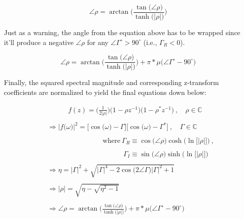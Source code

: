\documentclass{article}
\begin{document}
\begin{equation*}
    \angle{\rho} = \arctan\Bigg( \frac{\tan\big(\angle{\rho}\big)}{\tanh\big(\big|\rho\big|\big)} \Bigg)
  \end{equation*}\newline

Just as a warning, the angle from the equation above has to be wrapped since it'll produce a negative $\angle{\rho}$ for any $\angle{\Gamma}^{\circ} > 90^{\circ}$ (i.e., $\Gamma_{R} < 0$).

\begin{equation*}
    \angle{\rho} = \arctan\Bigg( \frac{\tan\big(\angle{\rho}\big)}{\tanh\big(\big|\rho\big|\big)} \Bigg) + \pi * \mu\Big(\angle{\Gamma}^{\circ} - 90^{\circ}\Big)
  \end{equation*}\newline

Finally, the squared spectral magnitude and corresponding z-transform coefficients are normalized to yield the final equations down below: 

\begin{align*}
    & \quad \quad \quad f(z) = \bigg(\frac{1}{2\big|\rho\big|}\bigg)\big(1 - \rho z^{-1}\big)\big(1 - \rho^{*}z^{-1}\big) \ , \quad \rho \in \mathbb{C} \\ \\
    & \Rightarrow \Big|f\big(\omega\big)\Big|^{2} = \Big[\cos\big(\omega\big) - \Gamma\Big]\Big[\cos\big(\omega\big) - \Gamma^{*}\Big] \ , \quad \Gamma \in \mathbb{C} \\ \\ 
    & \quad \quad \quad \quad \quad \quad \quad \quad \text{where} \ \Gamma_{R} \equiv \cos\big(\angle{\rho}\big)\cosh\Big(\ln\big[\big|\rho\big|\big]\Big) \ , \\ \\  
    & \quad \quad \quad \quad \quad \quad \quad \quad \quad \quad \quad \Gamma_{I} \equiv \sin\big(\angle{\rho}\big)\sinh\Big(\ln\big[\big|\rho\big|\big]\Big) \\ \\
    & \Rightarrow \eta = \big|\Gamma\big|^{2} + \sqrt{\big|\Gamma\big|^{4} - 2\cos\big(2\angle{\Gamma}\big)|\Gamma|^{2} + 1} \\ \\
    & \Rightarrow \big|\rho\Big| = \sqrt{\eta - \sqrt{\eta^{2} - 1}} \\ \\
    & \Rightarrow \angle{\rho} = \arctan\Bigg( \frac{\tan\big(\angle{\rho}\big)}{\tanh\big(\big|\rho\big|\big)} \Bigg) + \pi * \mu\Big(\angle{\Gamma}^{\circ} - 90^{\circ}\Big)
  \end{align*}
\end{document}
